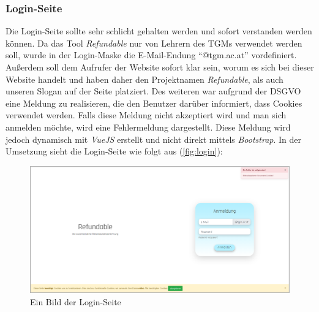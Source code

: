 \subsubsection{Login-Seite}
\label{chapter:implementierung-frontend-komponenten-login}
Die Login-Seite sollte sehr schlicht gehalten werden und sofort verstanden werden können. Da das Tool \textit{Refundable} nur von Lehrern des TGMs verwendet werden soll, wurde in der Login-Maske die E-Mail-Endung \enquote{@tgm.ac.at} vordefiniert. Außerdem soll dem Aufrufer der Website sofort klar sein, worum es sich bei dieser Website handelt und haben daher den Projektnamen \textit{Refundable}, als auch unseren Slogan auf der Seite platziert. Des weiteren war aufgrund der DSGVO eine Meldung zu realisieren, die den Benutzer darüber informiert, dass Cookies verwendet werden. Falls diese Meldung nicht akzeptiert wird und man sich anmelden möchte, wird eine Fehlermeldung dargestellt. Diese Meldung wird jedoch dynamisch mit \textit{VueJS} erstellt und nicht direkt mittels \textit{Bootstrap}. In der Umsetzung sieht die Login-Seite wie folgt aus (\autoref{fig:login}):
\begin{figure}[H]
	\centering
	\includegraphics[width=1\linewidth]{images/ldehner_implementierung/login}
	\caption[Login Seite]{Ein Bild der Login-Seite}
	\label{fig:login}
\end{figure}
